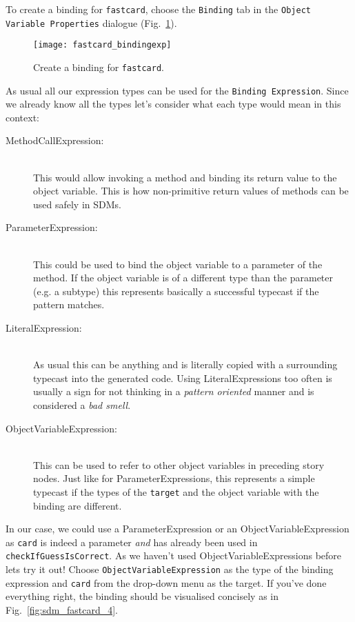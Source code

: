 To create a binding for \texttt{fastcard}, choose the \texttt{Binding} tab in the \texttt{Object Variable Properties} dialogue (Fig.~\ref{fig:sdm_fastcard_3}).

\begin{figure}[htbp]
\begin{center}
  \texttt{[image: fastcard\_bindingexp]}
  \caption{Create a binding for \texttt{fastcard}.}  
  \label{fig:sdm_fastcard_3}
\end{center}
\end{figure}

As usual all our expression types can be used for the \texttt{Binding Expression}.  
Since we already know all the types let's consider what each type would mean in this context: 
\begin{description}
  \item[MethodCallExpression:]~\\ This would allow invoking a method and binding
  its return value to the object variable.  This is how non-primitive return
  values of methods can be used safely in SDMs.
  \item[ParameterExpression:]~\\ This could be used to bind the object variable
  to a parameter of the method.  If the object variable is of a different type
  than the parameter (e.g. a subtype) this represents basically a successful
  typecast if the pattern matches.
  \item[LiteralExpression:]~\\ As usual this can be anything and is literally
  copied with a surrounding typecast into the generated code.  Using
  LiteralExpressions too often is usually a sign for not thinking in a
  \emph{pattern oriented} manner and is considered a \emph{bad smell}.
  \item[ObjectVariableExpression:]~\\ This can be used to refer to other object
  variables in preceding story nodes.  Just like for ParameterExpressions, this
  represents a simple typecast if the types of the \texttt{target} and the
  object variable with the binding are different.
\end{description}

In our case, we could use a ParameterExpression or an ObjectVariableExpression as \texttt{card} is indeed a parameter \emph{and} has already been used in
\texttt{checkIfGuessIsCorrect}. As we haven't used ObjectVariableExpressions before lets try it out! Choose \texttt{ObjectVariableExpression} as the type of the
binding expression and \texttt{card} from the drop-down menu as the target. If you've done everything right, the binding should be visualised concisely as in
Fig.~\ref{fig:sdm_fastcard_4}.
 
